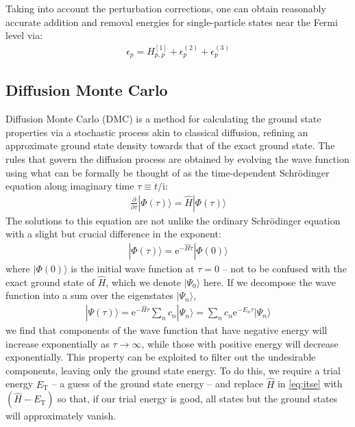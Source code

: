 \documentclass[amsmath, amssymb, aps, floatfix, nofootinbib, preprintnumbers,showpacs, superscriptaddress, twocolumn]{revtex4-1}
\begin{document}
Taking into account the perturbation corrections, one can obtain reasonably accurate addition and removal energies for single-particle states near the Fermi level via:
\begin{align*}
  \epsilon_p = H^{[1]}_{p, p} + \epsilon_p^{(2)} + \epsilon_p^{(3)}
\end{align*}

\subsection{Diffusion Monte Carlo}


Diffusion Monte Carlo (DMC) is a method for calculating the ground state
properties via a stochastic process akin to classical diffusion, refining an
approximate ground state density towards that of the exact ground state.  The
rules that govern the diffusion process are obtained by evolving the wave
function using what can be formally be thought of as the time-dependent
Schr\"odinger equation along imaginary time $\tau \equiv t / \mathrm{i}$:
\begin{align} \label{eq:itse}
  \frac{\partial}{\partial \tau} |\Phi(\tau)\rangle = \hat H |\Phi(\tau)\rangle
\end{align}
The solutions to this equation are not unlike the ordinary Schr\"odinger
equation with a slight but crucial difference in the exponent:
\begin{align*}
  |\Phi(\tau)\rangle = \mathrm e^{-\hat H \tau} |\Phi(0)\rangle
\end{align*}
where $|\Phi(0)\rangle$ is the initial wave function at $\tau = 0$ -- not to
be confused with the exact ground state of $\hat H$, which we denote
$|\Psi_0\rangle$ here.  If we decompose the wave function into a sum over the
eigenstates $|\Psi_n\rangle$,
\begin{align*}
  |\Psi(\tau)\rangle
  = \mathrm e^{-\hat H \tau} \sum_n c_n |\Psi_n\rangle
  = \sum_n c_n \mathrm e^{-E_n \tau} |\Psi_n\rangle
\end{align*}
we find that components of the wave function that have negative energy will
increase exponentially as $\tau \to \infty$, while those with positive energy
will decrease exponentially.  This property can be exploited to filter out the
undesirable components, leaving only the ground state energy.  To do this, we
require a trial energy $E_{\text{T}}$ -- a guess of the ground state energy --
and replace $\hat H$ in \eqref{eq:itse} with $(\hat H - E_{\text{T}})$ so
that, if our trial energy is good, all states but the ground states will
approximately vanish.
\end{document}
